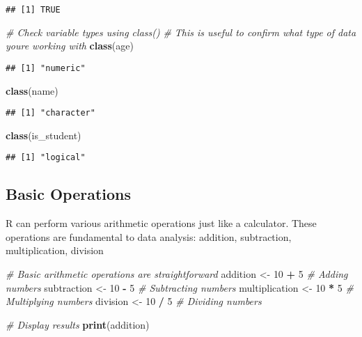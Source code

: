 \documentclass[
]{book}
\newenvironment{Shaded}{\begin{snugshade}}{\end{snugshade}}
\newcommand{\CommentTok}[1]{\textcolor[rgb]{0.56,0.35,0.01}{\textit{#1}}}
\newcommand{\DecValTok}[1]{\textcolor[rgb]{0.00,0.00,0.81}{#1}}
\newcommand{\FunctionTok}[1]{\textcolor[rgb]{0.13,0.29,0.53}{\textbf{#1}}}
\newcommand{\NormalTok}[1]{#1}
\newcommand{\OtherTok}[1]{\textcolor[rgb]{0.56,0.35,0.01}{#1}}
\newcommand{\SpecialCharTok}[1]{\textcolor[rgb]{0.81,0.36,0.00}{\textbf{#1}}}
\begin{document}
\begin{verbatim}
## [1] TRUE
\end{verbatim}

\begin{Shaded}
\begin{Highlighting}[]
\CommentTok{\# Check variable types using class()}
\CommentTok{\# This is useful to confirm what type of data you\textquotesingle{}re working with}
\FunctionTok{class}\NormalTok{(age)}
\end{Highlighting}
\end{Shaded}

\begin{verbatim}
## [1] "numeric"
\end{verbatim}

\begin{Shaded}
\begin{Highlighting}[]
\FunctionTok{class}\NormalTok{(name)}
\end{Highlighting}
\end{Shaded}

\begin{verbatim}
## [1] "character"
\end{verbatim}

\begin{Shaded}
\begin{Highlighting}[]
\FunctionTok{class}\NormalTok{(is\_student)}
\end{Highlighting}
\end{Shaded}

\begin{verbatim}
## [1] "logical"
\end{verbatim}

\subsection{Basic Operations}\label{basic-operations}

R can perform various arithmetic operations just like a calculator. These operations are fundamental to data analysis: addition, subtraction, multiplication, division

\begin{Shaded}
\begin{Highlighting}[]
\CommentTok{\# Basic arithmetic operations are straightforward}
\NormalTok{addition }\OtherTok{\textless{}{-}} \DecValTok{10} \SpecialCharTok{+} \DecValTok{5}       \CommentTok{\# Adding numbers}
\NormalTok{subtraction }\OtherTok{\textless{}{-}} \DecValTok{10} \SpecialCharTok{{-}} \DecValTok{5}    \CommentTok{\# Subtracting numbers}
\NormalTok{multiplication }\OtherTok{\textless{}{-}} \DecValTok{10} \SpecialCharTok{*} \DecValTok{5} \CommentTok{\# Multiplying numbers}
\NormalTok{division }\OtherTok{\textless{}{-}} \DecValTok{10} \SpecialCharTok{/} \DecValTok{5}       \CommentTok{\# Dividing numbers}

\CommentTok{\# Display results}
\FunctionTok{print}\NormalTok{(addition)}
\end{Highlighting}
\end{Shaded}
\end{document}
